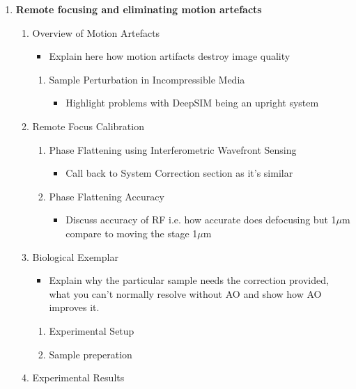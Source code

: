 \documentclass[twoside,onecolumn]{article}
\begin{document}
\begin{enumerate}[label*=\arabic*.]
	\item \textbf{Remote focusing and eliminating motion artefacts}
	\begin{enumerate}[label*=\arabic*.]
		\item Overview of Motion Artefacts
		\begin{itemize}
			\item Explain here how motion artifacts destroy image quality
		\end{itemize}
		\begin{enumerate}[label*=\arabic*.]
			\item Sample Perturbation in Incompressible Media
			\begin{itemize}
				\item Highlight problems with DeepSIM being an upright system
			\end{itemize}
		\end{enumerate}
		\item Remote Focus Calibration
		\begin{enumerate}[label*=\arabic*.]
			\item Phase Flattening using Interferometric Wavefront Sensing
			\begin{itemize}
				\item Call back to System Correction section as it's similar
			\end{itemize}
			\item Phase Flattening Accuracy
			\begin{itemize}
				\item Discuss accuracy of RF i.e. how accurate does defocusing but 1$\mu$m compare to moving the stage 1$\mu$m
			\end{itemize}
		\end{enumerate}
		\item Biological Exemplar
		\begin{itemize}
			\item Explain why the particular sample needs the correction provided, what you can't normally resolve without AO and show how  AO improves it.
		\end{itemize}
		\begin{enumerate}[label*=\arabic*.]
			\item Experimental Setup
			\item Sample preperation
		\end{enumerate}
		\item Experimental Results
	\end{enumerate}


\end{enumerate}
\end{document}

